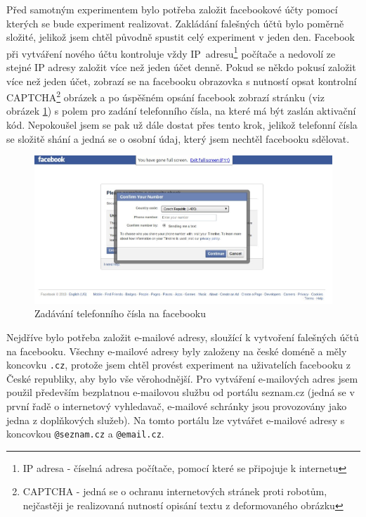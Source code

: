 \documentclass[thesis=M,czech]{FITthesis}[2013/05/10]
\begin{document}
Před samotným experimentem bylo potřeba založit facebookové účty pomocí kterých se bude experiment realizovat.
Zakládání falešných účtů bylo poměrně složité, jelikož jsem chtěl původně spustit celý experiment v jeden den. 
Facebook při vytváření nového účtu kontroluje vždy 
IP~adresu\footnote{IP adresa - číselná adresa počítače, pomocí které se připojuje k internetu} počítače a nedovolí ze stejné IP adresy založit více než jeden účet denně. 
Pokud se někdo pokusí založit více než jeden účet, zobrazí se na facebooku obrazovka s nutností opsat kontrolní 
CAPTCHA\footnote{CAPTCHA - jedná se o ochranu internetových stránek proti robotům, nejčastěji je realizovaná nutností opisání textu z deformovaného obrázku} obrázek a po úspěšném opsání facebook zobrazí stránku (viz obrázek \ref{fig:fbTelephoneNubmer}) s polem pro zadání telefonního čísla, na které má být zaslán aktivační kód.
Nepokoušel jsem se pak už dále dostat přes tento krok, jelikož telefonní čísla se složitě shání a jedná se o osobní údaj, který jsem nechtěl facebooku sdělovat.

\begin{figure}[h]
\begin{center}
\includegraphics[width=5in]{figures/fb-telephone-number2.jpg}
\caption{Zadávání telefonního čísla na facebooku}
\label{fig:fbTelephoneNubmer}
\end{center}
\end{figure}

Nejdříve bylo potřeba založit e-mailové adresy, sloužící k vytvoření falešných účtů na facebooku. 
Všechny e-mailové adresy byly založeny na české doméně a měly koncovku \verb|.cz|, protože jsem chtěl provést experiment na uživatelích facebooku z České republiky, aby bylo vše věrohodnější.
Pro vytváření e-mailových adres jsem použil především bezplatnou e-mailovou službu od portálu seznam.cz (jedná se v první řadě o internetový vyhledavač, e-mailové schránky jsou provozovány jako jedna z doplňkových služeb). 
Na tomto portálu lze vytvářet e-mailové adresy s koncovkou \verb|@seznam.cz| a \verb|@email.cz|.
\end{document}
